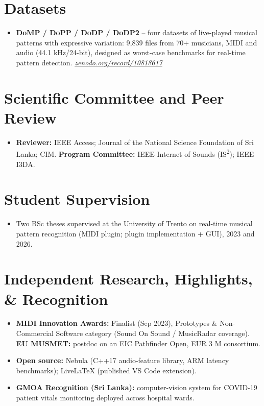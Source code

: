 \documentclass[11pt]{article}
\begin{document}
\section*{Datasets \footnotesize {}}
\begin{itemize}[leftmargin=1.2em, itemsep=-0.25em]
    \item \textbf{DoMP / DoPP / DoDP / DoDP2} -- four datasets of live-played musical patterns with expressive variation: 9,839 files from 70+ musicians, MIDI and audio (44.1 kHz/24-bit), designed as worst-case benchmarks for real-time pattern detection. \href{https://zenodo.org/record/10818617}{\textit{zenodo.org/record/10818617}}
\end{itemize}

\section*{Scientific Committee and Peer Review}
\begin{itemize}[leftmargin=1.2em, itemsep=-0.25em]
    \item \textbf{Reviewer:} IEEE Access; Journal of the National Science Foundation of Sri Lanka; CIM. \textbf{Program Committee:} IEEE Internet of Sounds (IS\textsuperscript{2}); IEEE I3DA.
\end{itemize}

\section*{Student Supervision}
\begin{itemize}[leftmargin=1.2em, itemsep=-0.25em]
    \item Two BSc theses supervised at the University of Trento on real-time musical pattern recognition (MIDI plugin; plugin implementation + GUI), 2023 and 2026.
\end{itemize}

\section*{Independent Research, Highlights, \& Recognition}
\begin{itemize}[leftmargin=1.2em, itemsep=-0.25em]
    \item \textbf{MIDI Innovation Awards:} Finalist (Sep 2023), Prototypes \& Non-Commercial Software category (Sound On Sound / MusicRadar coverage). \textbf{EU MUSMET:} postdoc on an EIC Pathfinder Open, EUR 3 M consortium.
    \item \textbf{Open source:} Nebula (C++17 audio-feature library, ARM latency benchmarks); LiveLaTeX (published VS Code extension).
    \item \textbf{GMOA Recognition (Sri Lanka):} computer-vision system for COVID-19 patient vitals monitoring deployed across hospital wards.
\end{itemize}
\end{document}
